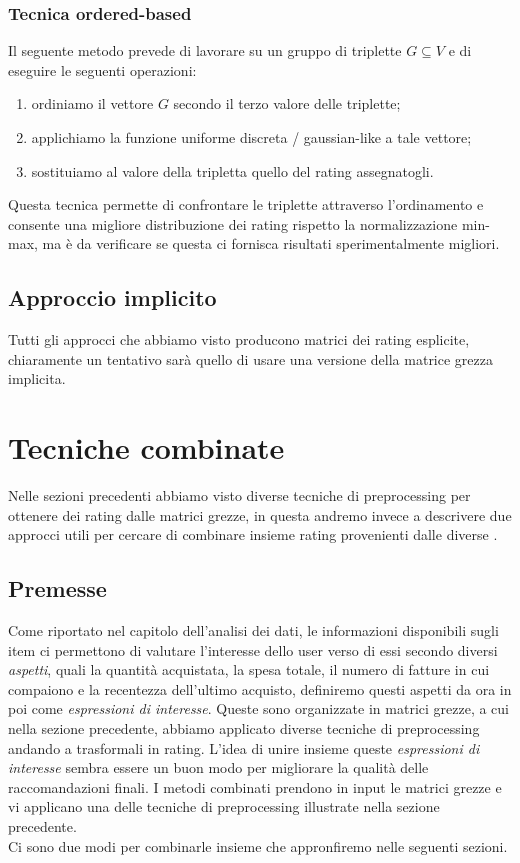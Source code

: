\subsubsection{Tecnica ordered-based}
Il seguente metodo prevede di lavorare su un gruppo di triplette $G \subseteq V$ e di eseguire le seguenti operazioni:
\begin{enumerate}
    \item ordiniamo il vettore $G$ secondo il terzo valore delle triplette;
    \item applichiamo la funzione uniforme discreta / gaussian-like a tale vettore;
    \item sostituiamo al valore della tripletta quello del rating assegnatogli.
\end{enumerate}

Questa tecnica permette di confrontare le triplette attraverso l'ordinamento e consente una migliore distribuzione dei rating rispetto la normalizzazione min-max, ma è da verificare se questa ci fornisca risultati sperimentalmente migliori.

\subsection{Approccio implicito}
Tutti gli approcci che abbiamo visto producono matrici dei rating esplicite, chiaramente un tentativo sarà quello di usare una versione della matrice grezza implicita.

\section{Tecniche combinate}
Nelle sezioni precedenti abbiamo visto diverse tecniche di preprocessing per ottenere dei rating dalle matrici grezze, in questa andremo invece a descrivere due approcci utili per cercare di combinare insieme rating provenienti dalle diverse .
\subsection{Premesse}
Come riportato nel capitolo dell'analisi dei dati, le informazioni disponibili sugli item ci permettono di valutare l'interesse dello user verso di essi secondo diversi \textit{aspetti}, quali la quantità acquistata, la spesa totale, il numero di fatture in cui compaiono e la recentezza dell'ultimo acquisto, definiremo questi aspetti da ora in poi come \textit{espressioni di interesse}.
Queste sono organizzate in matrici grezze, a cui nella sezione precedente, abbiamo applicato diverse tecniche di preprocessing andando a trasformali in rating. L'idea di unire insieme queste \textit{espressioni di interesse} sembra essere un buon modo per migliorare la qualità delle raccomandazioni finali.
I metodi combinati prendono in input le matrici grezze e vi applicano una delle tecniche di preprocessing illustrate nella sezione precedente.\\
Ci sono due modi per combinarle insieme che appronfiremo nelle seguenti sezioni.

